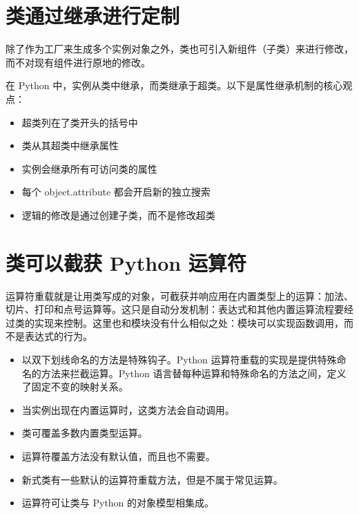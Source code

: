 \section{类通过继承进行定制}
除了作为工厂来生成多个实例对象之外，类也可引入新组件（子类）来进行修改，而不对现有组件进行原地的修改。

在 Python 中，实例从类中继承，而类继承于超类。以下是属性继承机制的核心观点：
\begin{itemize}
    \item 超类列在了类开头的括号中
    \item 类从其超类中继承属性
    \item 实例会继承所有可访问类的属性
    \item 每个 object.attribute 都会开启新的独立搜索
    \item 逻辑的修改是通过创建子类，而不是修改超类
\end{itemize}
\section{类可以截获 Python 运算符}
运算符重载就是让用类写成的对象，可截获并响应用在内置类型上的运算：加法、切片、打印和点号运算等。这只是自动分发机制：表达式和其他内置运算流程要经过类的实现来控制。这里也和模块没有什么相似之处：模块可以实现函数调用，而不是表达式的行为。

\begin{itemize}
    \item 以双下划线命名的方法是特殊钩子。Python 运算符重载的实现是提供特殊命名的方法来拦截运算。Python 语言替每种运算和特殊命名的方法之间，定义了固定不变的映射关系。
    \item 当实例出现在内置运算时，这类方法会自动调用。
    \item 类可覆盖多数内置类型运算。
    \item 运算符覆盖方法没有默认值，而且也不需要。
    \item 新式类有一些默认的运算符重载方法，但是不属于常见运算。
    \item 运算符可让类与 Python 的对象模型相集成。
\end{itemize}